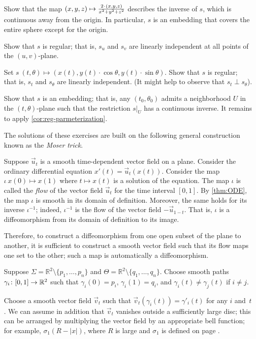 \begin{multicols}{2}
Show that the map 
$(x,y,z)\z\mapsto \tfrac{2\cdot(x,y,z)}{x^2+y^2+z^2}$
describes the inverse of $s$, which is continuous away from the origin.
In particular, $s$ is an embedding that covers the entire sphere except for the origin.

Show that $s$ is regular; that is, $s_u$ and $s_v$ are linearly independent at all points of the $(u,v)$-plane.

Set
$s\:(t,\theta)\mapsto (x(t), y(t)\cdot\cos\theta,y(t)\cdot\sin\theta)$.
Show that $s$ is regular; that is, $s_t$ and $s_\theta$ are linearly independent.
(It might help to observe that $s_t\perp s_\theta$).

Show that $s$ is an embedding;
that is, any $(t_0,\theta_0)$ admits a neighborhood $U$ in the $(t,\theta)$-plane such that the restriction $s|_U$ has a continuous inverse.
It remains to apply \ref{cor:reg-parmeterization}.

The solutions of these exercises are built on the following general construction known as the \emph{Moser trick}.

Suppose $\vec u_t$ is a smooth time-dependent vector field on a plane.
Consider the ordinary differential equation $x'(t)=\vec u_t(x(t))$.
Consider the map $\iota\:x(0)\mapsto x(1)$ where $t\mapsto x(t)$ is a solution of the equation.
The map $\iota$ is called the \emph{flow} of the vector field $\vec u_t$ for the time interval $[0,1]$.
By \ref{thm:ODE}, the map $\iota$ is smooth in its domain of definition.
Moreover, the same holds for its inverse $\iota^{-1}$;
indeed, $\iota^{-1}$ is the flow of the vector field $-\vec u_{1-t}$.
That is, $\iota$ is a diffeomorphism from its domain of definition to its image. 


Therefore, to construct a diffeomorphism from one open subset of the plane to another, it is sufficient to construct a smooth vector field such that its flow maps one set to the other;
such a map is automatically a diffeomorphism.


Suppose $\Sigma=\mathbb{R}^2\setminus\{p_1,\dots,p_n\}$ and $\Theta=\mathbb{R}^2\setminus\{q_1,\dots,q_n\}$.
Choose smooth paths $\gamma_i\:[0,1]\z\to \mathbb{R}^2$ such that $\gamma_i(0)=p_i$,
$\gamma_i(1)=q_i$, and $\gamma_i(t)\ne \gamma_j(t)$ if $i\ne j$.

Choose a smooth vector field $\vec v_t$ such that $\vec v_t(\gamma_i(t))=\gamma'_i(t)$ for any $i$ and~$t$.
We can assume in addition that $\vec v_t$ vanishes outside a sufficiently large disc; this can be arranged by multiplying the vector field by an appropriate bell function;
for example, $\sigma_1(R-|x|)$, where $R$ is large and $\sigma_1$ is defined on page \pageref{page:sigma-function}.


\end{multicols}
